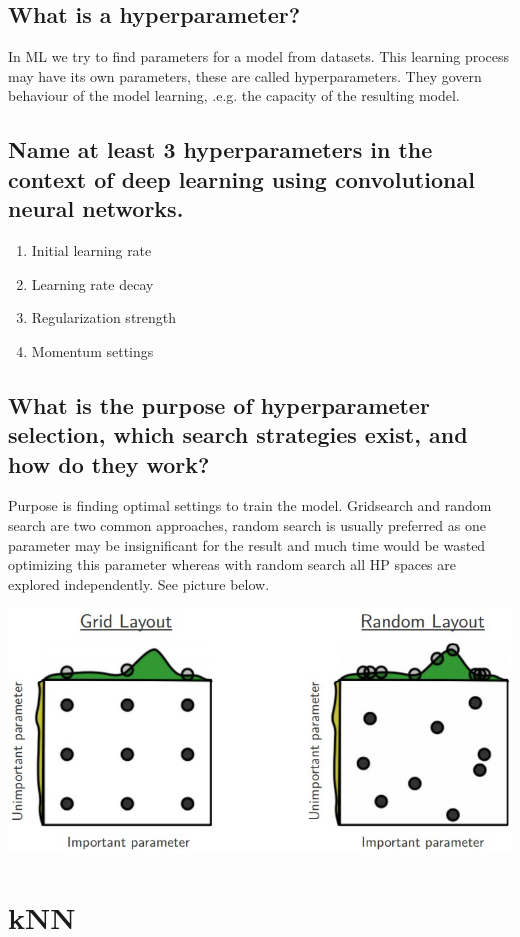 \subsection{What is a hyperparameter?}
In ML we try to find parameters for a model from datasets. This learning process may have its own parameters, these are called hyperparameters. They govern behaviour of the model learning, .e.g. the capacity of the resulting model.
\subsection{Name at least 3 hyperparameters in the context of deep learning using convolutional neural networks.}
\begin{enumerate}
\item Initial learning rate
\item Learning rate decay
\item Regularization strength
\item Momentum settings
\end{enumerate}
\subsection{What is the purpose of hyperparameter selection, which search strategies exist, and how do they work?}
Purpose is finding optimal settings to train the model. Gridsearch and random search are two common approaches, random search is usually preferred as one parameter may be insignificant for the result and much time would be wasted optimizing this parameter whereas with random search all HP spaces are explored independently. See picture below.

\includegraphics[width=\textwidth]{./img/gridsearchbad.jpeg}
%
\section{kNN}
